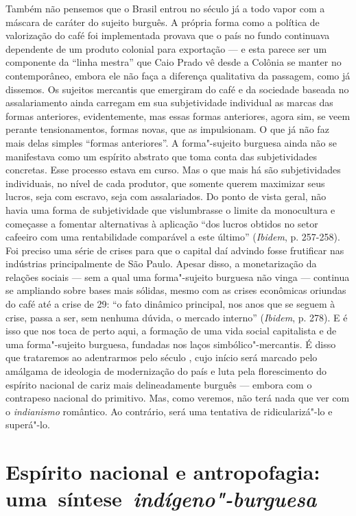 Também não pensemos que o Brasil entrou no século  já a todo vapor
com a máscara de caráter do sujeito burguês. A própria forma como a
política de valorização do café foi implementada provava que o país no
fundo continuava dependente de um produto colonial para exportação --- e
esta parece ser um componente da ``linha mestra'' que Caio Prado vê
desde a Colônia se manter no contemporâneo, embora ele não faça a
diferença qualitativa da passagem, como já dissemos. Os sujeitos
mercantis que emergiram do café e da sociedade baseada no assalariamento
ainda carregam em sua subjetividade individual as marcas das formas
anteriores, evidentemente, mas essas formas anteriores, agora sim, se
veem perante tensionamentos, formas novas, que as impulsionam. O que já
não faz mais delas simples ``formas anteriores''. A forma"-sujeito
burguesa ainda não se manifestava como um espírito abstrato que toma
conta das subjetividades concretas. Esse processo estava em curso. Mas o
que mais há são subjetividades individuais, no nível de cada produtor,
que somente querem maximizar seus lucros, seja com escravo, seja com
assalariados. Do ponto de vista geral, não havia uma forma de
subjetividade que vislumbrasse o limite da monocultura e começasse a
fomentar alternativas à aplicação ``dos lucros obtidos no setor cafeeiro
com uma rentabilidade comparável a este último'' (\emph{Ibidem}, p.
257-258). Foi preciso uma série de crises para que o capital daí advindo
fosse frutificar nas indústrias principalmente de São Paulo. Apesar
disso, a monetarização da relações sociais --- sem a qual uma
forma"-sujeito burguesa não vinga --- continua se ampliando sobre bases
mais sólidas, mesmo com as crises econômicas oriundas do café até a
crise de 29: ``o fato dinâmico principal, nos anos que se seguem à
crise, passa a ser, sem nenhuma dúvida, o mercado interno''
(\emph{Ibidem}, p. 278). E é isso que nos toca de perto aqui, a formação
de uma vida social capitalista e de uma forma"-sujeito burguesa, fundadas
nos laços simbólico"-mercantis. É disso que trataremos ao adentrarmos
pelo século , cujo início será marcado pelo amálgama de ideologia de
modernização do país e luta pela florescimento do espírito nacional de
cariz mais delineadamente burguês --- embora com o contrapeso nacional do
primitivo. Mas, como veremos, não terá nada que ver com o
\emph{indianismo} romântico. Ao contrário, será uma tentativa de
ridicularizá"-lo e superá"-lo.

\section*{Espírito nacional e antropofagia: uma~síntese~\emph{indígeno"-burguesa}}

